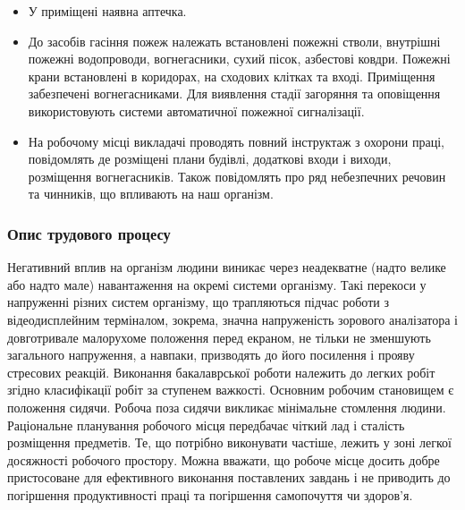 \documentclass[12pt,a4paper]{article}
\begin{document}
\begin{itemize}
\item У приміщені наявна аптечка. 
\item До засобів гасіння пожеж належать встановлені пожежні стволи, внутрішні пожежні водопроводи, вогнегасники, сухий пісок, азбестові ковдри. Пожежні крани встановлені в коридорах, на сходових клітках та вході. Приміщення забезпечені вогнегасниками. Для виявлення стадії загоряння та оповіщення використовують системи автоматичної пожежної сигналізації.
\item На робочому місці викладачі проводять повний інструктаж з  охорони праці, повідомлять де розміщені плани будівлі, додаткові входи і виходи, розміщення вогнегасників. Також повідомлять про ряд небезпечних речовин та чинників, що впливають на наш організм.
\end{itemize}
\subsubsection{Опис трудового процесу} 
Негативний вплив на організм людини виникає через неадекватне (надто велике або надто мале) навантаження на окремі системи організму. Такі перекоси у напруженні різних систем організму, що трапляються підчас роботи з відеодисплейним терміналом, зокрема, значна напруженість зорового аналізатора і довготривале малорухоме положення перед екраном, не тільки не зменшують загального напруження, а навпаки, призводять до його посилення і прояву стресових реакцій.
Виконання бакалаврської роботи належить до легких робіт згідно класифікації робіт за ступенем важкості.
Основним робочим становищем є положення сидячи. Робоча поза сидячи викликає мінімальне стомлення людини. Раціональне планування робочого місця передбачає чіткий лад і сталість розміщення предметів. Те, що потрібно виконувати частіше, лежить у зоні легкої досяжності робочого простору. 
Можна вважати, що робоче місце досить добре пристосоване для ефективного виконання поставлених завдань і не приводить до погіршення продуктивності праці та погіршення самопочуття чи здоров’я.
\end{document}
